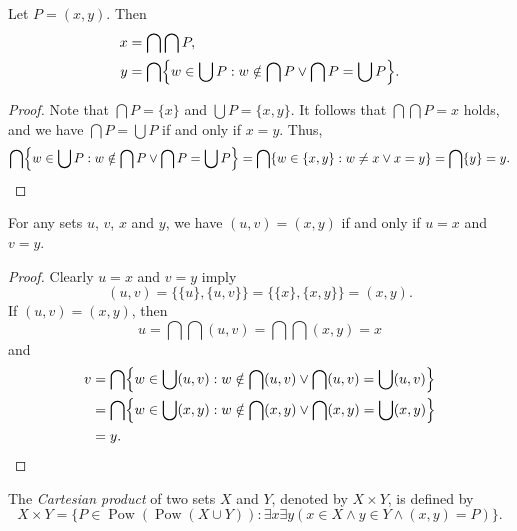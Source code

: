 \documentclass[11pt]{article}
\DeclareMathOperator{\pow}{Pow}
\begin{document}
\begin{theorem}
  Let $P = (x, y)$.
  Then
  \begin{align*}
    x &= \bigcap \bigcap P, \\
    y &= \bigcap \Bigl\{w \in \bigcup P: w \notin \bigcap P \vee \bigcap P = \bigcup P\Bigr\}.
  \end{align*}
\end{theorem}
\begin{proof}
  Note that $\bigcap P = \{x\}$ and $\bigcup P = \{x, y\}$.
  It follows that $\bigcap \bigcap P = x$ holds, and we have $\bigcap P = \bigcup P$ if and only if $x = y$.
  Thus,
  \begin{equation*}
    \bigcap \Bigl\{w \in \bigcup P: w \notin \bigcap P \vee \bigcap P = \bigcup P\Bigr\}
    = \bigcap \{w \in \{x, y\}: w \neq x \vee x = y\}
    = \bigcap \{y\}
    = y.
    \qedhere
  \end{equation*}
\end{proof}

\begin{corollary}
  For any sets $u$, $v$, $x$ and $y$, we have $(u, v) = (x, y)$ if and only if $u = x$ and $v = y$.
\end{corollary}
\begin{proof}
  Clearly $u = x$ and $v = y$ imply
  \begin{equation*}
    (u, v)
    = \{\{u\}, \{u, v\}\}
    = \{\{x\}, \{x, y\}\}
    = (x, y).
  \end{equation*}
  If $(u, v) = (x, y)$, then
  \begin{equation*}
    u = \bigcap \bigcap (u, v) = \bigcap \bigcap (x, y) = x
  \end{equation*}
  and
  \begin{align*}
    v
    &= \bigcap \Bigl\{w \in \bigcup (u, v): w \notin \bigcap (u, v) \vee \bigcap (u, v) = \bigcup (u, v)\Bigr\} \\
    &= \bigcap \Bigl\{w \in \bigcup (x, y): w \notin \bigcap (x, y) \vee \bigcap (x, y) = \bigcup (x, y)\Bigr\} \\
    &= y.
    \qedhere
  \end{align*}
\end{proof}

\begin{definition}
  The \emph{Cartesian product} of two sets $X$ and $Y$, denoted by $X \times Y$, is defined by
  \begin{equation*}
    X \times Y = \{P \in \pow(\pow(X \cup Y)): \exists x \exists y (x \in X \wedge y \in Y \wedge (x, y) = P)\}.
  \end{equation*}
\end{definition}
\end{document}
